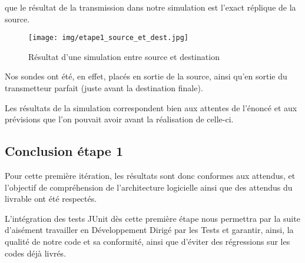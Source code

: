 que le résultat de la transmission dans notre simulation est l'exact réplique de la source.

\begin{figure}[H]
    \centering
    \texttt{[image: img/etape1\_source\_et\_dest.jpg]}
    \caption{Résultat d'une simulation entre source et destination}
    \label{fig:simulation1}
\end{figure}

Nos sondes ont été, en effet, placés en sortie de la source, ainsi qu'en sortie du transmetteur parfait (juste avant la destination finale).

Les résultats de la simulation correspondent bien aux attentes de l'énoncé et aux prévisions que l'on pouvait avoir avant la réalisation de celle-ci.

\subsection{Conclusion étape 1}

Pour cette première itération, les résultats sont donc conformes aux attendus, et l'objectif de compréhension de l'architecture logicielle ainsi que des attendus du livrable ont été respectés.

L'intégration des tests JUnit dès cette première étape nous permettra par la suite d'aisément travailler en Développement Dirigé par les Tests et garantir, ainsi, la qualité de notre code et sa conformité, ainsi que d'éviter des régressions sur les codes déjà livrés.


